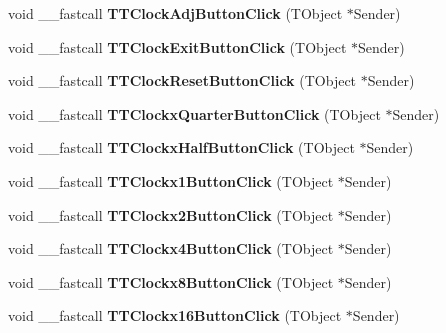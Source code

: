\begin{DoxyCompactItemize}
void \+\_\+\+\_\+fastcall {\bfseries T\+T\+Clock\+Adj\+Button\+Click} (T\+Object $\ast$Sender)
\item 
\mbox{\label{class_t_interface_ac0f4c7c25b33ba2c72a6821065d528e8}} 
void \+\_\+\+\_\+fastcall {\bfseries T\+T\+Clock\+Exit\+Button\+Click} (T\+Object $\ast$Sender)
\item 
\mbox{\label{class_t_interface_a535ad680d3f229f12b44d3c299bce209}} 
void \+\_\+\+\_\+fastcall {\bfseries T\+T\+Clock\+Reset\+Button\+Click} (T\+Object $\ast$Sender)
\item 
\mbox{\label{class_t_interface_ad83e07e35e7ac413a528f5f4df8f8992}} 
void \+\_\+\+\_\+fastcall {\bfseries T\+T\+Clockx\+Quarter\+Button\+Click} (T\+Object $\ast$Sender)
\item 
\mbox{\label{class_t_interface_a3328f78be04b67a099be5b4ba90d7a23}} 
void \+\_\+\+\_\+fastcall {\bfseries T\+T\+Clockx\+Half\+Button\+Click} (T\+Object $\ast$Sender)
\item 
\mbox{\label{class_t_interface_a08fd2066bb1c0d84fc952b259ad430f7}} 
void \+\_\+\+\_\+fastcall {\bfseries T\+T\+Clockx1\+Button\+Click} (T\+Object $\ast$Sender)
\item 
\mbox{\label{class_t_interface_a9cae187911cf974b08d7532ee9c3424d}} 
void \+\_\+\+\_\+fastcall {\bfseries T\+T\+Clockx2\+Button\+Click} (T\+Object $\ast$Sender)
\item 
\mbox{\label{class_t_interface_ab716d9b9d030fd6acd134ad9a99ac21a}} 
void \+\_\+\+\_\+fastcall {\bfseries T\+T\+Clockx4\+Button\+Click} (T\+Object $\ast$Sender)
\item 
\mbox{\label{class_t_interface_ad565ae7d179a5230e8679c0d4e4666e5}} 
void \+\_\+\+\_\+fastcall {\bfseries T\+T\+Clockx8\+Button\+Click} (T\+Object $\ast$Sender)
\item 
\mbox{\label{class_t_interface_a4d15b0fdf4e9377ed3b528787d466be4}} 
void \+\_\+\+\_\+fastcall {\bfseries T\+T\+Clockx16\+Button\+Click} (T\+Object $\ast$Sender)
\item 

\end{DoxyCompactItemize}
